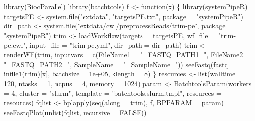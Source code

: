 \documentclass[14pt,]{article}
\newcommand{\hlnum}[1]{\textcolor[rgb]{0.816,0.125,0.439}{#1}}%
\newcommand{\hlstr}[1]{\textcolor[rgb]{0.251,0.627,0.251}{#1}}%
\newcommand{\hlstd}[1]{\textcolor[rgb]{0.251,0.251,0.251}{#1}}%
\newcommand{\hlkwd}[1]{\textcolor[rgb]{0.878,0.439,0.125}{#1}}%
\newenvironment{Shaded}{\begin{myshaded}}{\end{myshaded}}
\newcommand{\DecValTok}[1]{\hlnum{#1}}
\newcommand{\FloatTok}[1]{\hlnum{#1}}
\newcommand{\ConstantTok}[1]{\hlnum{#1}}
\newcommand{\StringTok}[1]{\hlstr{#1}}
\newcommand{\OtherTok}[1]{{#1}}
\newcommand{\FunctionTok}[1]{\hlstd{#1}}
\newcommand{\ControlFlowTok}[1]{\hlkwd{#1}}
\newcommand{\AttributeTok}[1]{{#1}}
\newcommand{\NormalTok}[1]{\hlstd{#1}}
\begin{document}
\begin{Shaded}
\begin{Highlighting}[]
\FunctionTok{library}\NormalTok{(BiocParallel)}
\FunctionTok{library}\NormalTok{(batchtools)}
\NormalTok{f }\OtherTok{\textless{}{-}} \ControlFlowTok{function}\NormalTok{(x) \{}
    \FunctionTok{library}\NormalTok{(systemPipeR)}
\NormalTok{    targetsPE }\OtherTok{\textless{}{-}} \FunctionTok{system.file}\NormalTok{(}\StringTok{"extdata"}\NormalTok{, }\StringTok{"targetsPE.txt"}\NormalTok{, }\AttributeTok{package =} \StringTok{"systemPipeR"}\NormalTok{)}
\NormalTok{    dir\_path }\OtherTok{\textless{}{-}} \FunctionTok{system.file}\NormalTok{(}\StringTok{"extdata/cwl/preprocessReads/trim{-}pe"}\NormalTok{, }\AttributeTok{package =} \StringTok{"systemPipeR"}\NormalTok{)}
\NormalTok{    trim }\OtherTok{\textless{}{-}} \FunctionTok{loadWorkflow}\NormalTok{(}\AttributeTok{targets =}\NormalTok{ targetsPE, }\AttributeTok{wf\_file =} \StringTok{"trim{-}pe.cwl"}\NormalTok{, }\AttributeTok{input\_file =} \StringTok{"trim{-}pe.yml"}\NormalTok{, }
        \AttributeTok{dir\_path =}\NormalTok{ dir\_path)}
\NormalTok{    trim }\OtherTok{\textless{}{-}} \FunctionTok{renderWF}\NormalTok{(trim, }\AttributeTok{inputvars =} \FunctionTok{c}\NormalTok{(}\AttributeTok{FileName1 =} \StringTok{"\_FASTQ\_PATH1\_"}\NormalTok{, }\AttributeTok{FileName2 =} \StringTok{"\_FASTQ\_PATH2\_"}\NormalTok{, }
        \AttributeTok{SampleName =} \StringTok{"\_SampleName\_"}\NormalTok{))}
    \FunctionTok{seeFastq}\NormalTok{(}\AttributeTok{fastq =} \FunctionTok{infile1}\NormalTok{(trim)[x], }\AttributeTok{batchsize =} \FloatTok{1e+05}\NormalTok{, }\AttributeTok{klength =} \DecValTok{8}\NormalTok{)}
\NormalTok{\}}
\NormalTok{resources }\OtherTok{\textless{}{-}} \FunctionTok{list}\NormalTok{(}\AttributeTok{walltime =} \DecValTok{120}\NormalTok{, }\AttributeTok{ntasks =} \DecValTok{1}\NormalTok{, }\AttributeTok{ncpus =} \DecValTok{4}\NormalTok{, }\AttributeTok{memory =} \DecValTok{1024}\NormalTok{)}
\NormalTok{param }\OtherTok{\textless{}{-}} \FunctionTok{BatchtoolsParam}\NormalTok{(}\AttributeTok{workers =} \DecValTok{4}\NormalTok{, }\AttributeTok{cluster =} \StringTok{"slurm"}\NormalTok{, }\AttributeTok{template =} \StringTok{"batchtools.slurm.tmpl"}\NormalTok{, }
    \AttributeTok{resources =}\NormalTok{ resources)}
\NormalTok{fqlist }\OtherTok{\textless{}{-}} \FunctionTok{bplapply}\NormalTok{(}\FunctionTok{seq}\NormalTok{(}\AttributeTok{along =}\NormalTok{ trim), f, }\AttributeTok{BPPARAM =}\NormalTok{ param)}
\FunctionTok{seeFastqPlot}\NormalTok{(}\FunctionTok{unlist}\NormalTok{(fqlist, }\AttributeTok{recursive =} \ConstantTok{FALSE}\NormalTok{))}
\end{Highlighting}
\end{Shaded}
\end{document}
